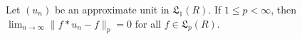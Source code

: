 Let $(u_n)$ be an approximate unit in $\mathfrak{L}_1(R)$. If $1 \leq p < \infty$, then $\lim_{n \to \infty} \|f * u_n - f\|_p = 0$ for all $f \in \mathfrak{L}_p(R)$.
